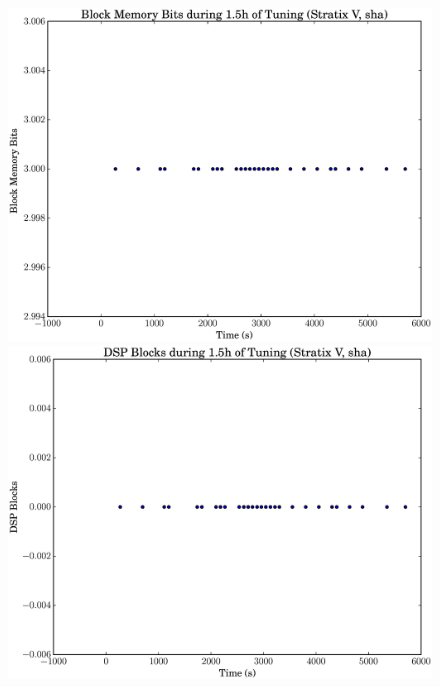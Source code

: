 \documentclass[12pt, a4paper]{article}
\begin{document}
\begin{figure}[htpb]
    \begin{minipage}{.48\textwidth}
        \includegraphics[scale=.25]{sha_block_5400_chstone_StratixV}
    \end{minipage}%
    \hfill
    \begin{minipage}{.48\textwidth}
        \includegraphics[scale=.25]{sha_dsp_5400_chstone_StratixV}
    \end{minipage}%


\end{figure}
\end{document}
